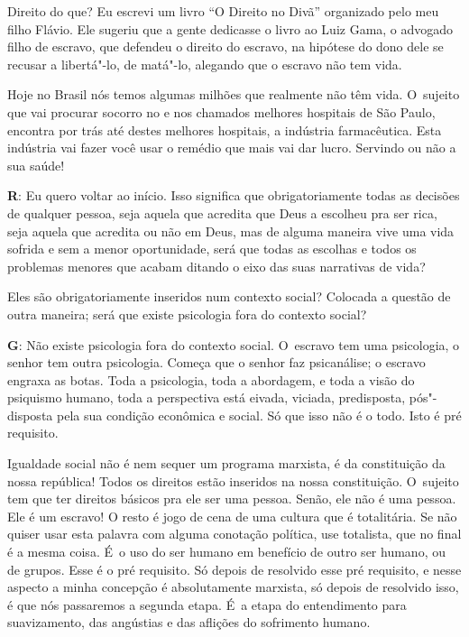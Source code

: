  

Direito do que? Eu escrevi um livro ``O Direito no Divã'' organizado
pelo meu filho Flávio. Ele sugeriu que a gente dedicasse o livro ao Luiz
Gama, o advogado filho de escravo, que defendeu o direito
do escravo, na hipótese do dono dele se recusar a libertá"-lo, de
matá"-lo, alegando que o escravo não tem vida.

 

Hoje no Brasil nós temos algumas milhões que realmente não têm vida. O~sujeito que vai procurar socorro no  e nos chamados melhores
hospitais de São Paulo, encontra por trás até destes melhores hospitais,
a indústria farmacêutica. Esta indústria vai fazer você usar o remédio
que mais vai dar lucro. Servindo ou não a sua saúde!

 

\textbf{R}: Eu quero voltar ao início. Isso significa que
obrigatoriamente todas as decisões de qualquer pessoa, seja aquela que
acredita que Deus a escolheu pra ser rica, seja aquela que acredita ou
não em Deus, mas de alguma maneira vive uma vida sofrida e sem a menor
oportunidade, será que todas as escolhas e todos os problemas menores
que acabam ditando o eixo das suas narrativas de vida?

 

Eles são obrigatoriamente inseridos num contexto social? Colocada a
questão de outra maneira; será que existe psicologia fora do contexto
social?

 

\textbf{G}: Não existe psicologia fora do contexto social. O~escravo tem
uma psicologia, o senhor tem outra psicologia. Começa que o senhor faz
psicanálise; o escravo engraxa as botas. Toda a psicologia, toda a
abordagem, e toda a visão do psiquismo humano, toda a perspectiva está
eivada, viciada, predisposta, pós"-disposta pela sua condição econômica e
social. Só que isso não é o todo. Isto é pré requisito.

 

Igualdade social não é nem sequer um programa marxista, é da
constituição da nossa república! Todos os direitos estão inseridos na
nossa constituição. O~sujeito tem que ter direitos básicos pra ele ser
uma pessoa. Senão, ele não é uma pessoa. Ele é um escravo! O resto é jogo
de cena de uma cultura que é totalitária. Se não quiser usar esta
palavra com alguma conotação política, use totalista, que no final é a
mesma coisa. É~o uso do ser humano em benefício de outro ser humano, ou
de grupos. Esse é o pré requisito. Só depois de resolvido esse pré
requisito, e nesse aspecto a minha concepção é absolutamente marxista,
só depois de resolvido isso, é que nós passaremos a segunda etapa. É~a
etapa do entendimento para suavizamento, das angústias e das aflições do
sofrimento humano.


